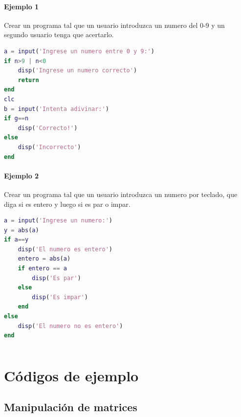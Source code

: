 \paragraph{Ejemplo 1}

Crear un programa tal que un usuario introduzca un numero del 0-9 y un segundo usuario tenga que acertarlo.\\
\begin{lstlisting}[language=Matlab]
a = input('Ingrese un numero entre 0 y 9:')
if n>9 | n<0
    disp('Ingrese un numero correcto')
    return
end
clc
b = input('Intenta adivinar:')
if g==n
    disp('Correcto!')
else
    disp('Incorrecto')
end
\end{lstlisting}

\paragraph{Ejemplo 2}

Crear un programa tal que un usuario introduzca un numero por teclado, que diga si es entero y luego si es par o impar.\\
\begin{lstlisting}[language=Matlab]
a = input('Ingrese un numero:')
y = abs(a)
if a==y
    disp('El numero es entero')
    entero = abs(a)
    if entero == a
        disp('Es par')
    else
        disp('Es impar')
    end
else
    disp('El numero no es entero')
end
\end{lstlisting}

\begin{lstlisting}[language=Matlab]

\end{lstlisting}


\section{Códigos de ejemplo}

\subsection{Manipulación de matrices}

